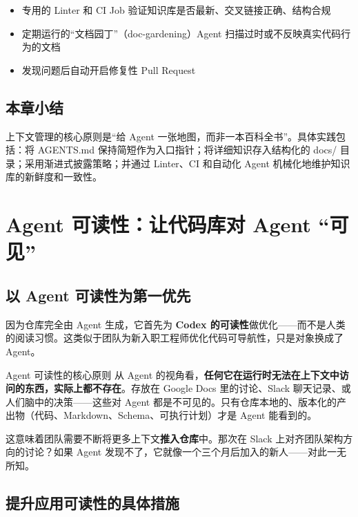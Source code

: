 \documentclass[a4paper]{article}
\begin{document}
\begin{itemize}[nosep]
  \item 专用的 Linter 和 CI Job 验证知识库是否最新、交叉链接正确、结构合规
  \item 定期运行的``文档园丁''（doc-gardening）Agent 扫描过时或不反映真实代码行为的文档
  \item 发现问题后自动开启修复性 Pull Request
\end{itemize}

\subsection{本章小结}

上下文管理的核心原则是``给 Agent 一张地图，而非一本百科全书''。具体实践包括：将 AGENTS.md 保持简短作为入口指针；将详细知识存入结构化的 docs/ 目录；采用渐进式披露策略；并通过 Linter、CI 和自动化 Agent 机械化地维护知识库的新鲜度和一致性。

\newpage

\section{Agent 可读性：让代码库对 Agent ``可见''}

\subsection{以 Agent 可读性为第一优先}

因为仓库完全由 Agent 生成，它首先为 \textbf{Codex 的可读性}做优化——而不是人类的阅读习惯。这类似于团队为新入职工程师优化代码可导航性，只是对象换成了 Agent。

\begin{importantbox}{Agent 可读性的核心原则}
从 Agent 的视角看，\textbf{任何它在运行时无法在上下文中访问的东西，实际上都不存在}。存放在 Google Docs 里的讨论、Slack 聊天记录、或人们脑中的决策——这些对 Agent 都是不可见的。只有仓库本地的、版本化的产出物（代码、Markdown、Schema、可执行计划）才是 Agent 能看到的。
\end{importantbox}

这意味着团队需要不断将更多上下文\textbf{推入仓库}中。那次在 Slack 上对齐团队架构方向的讨论？如果 Agent 发现不了，它就像一个三个月后加入的新人——对此一无所知。

\subsection{提升应用可读性的具体措施}
\end{document}

